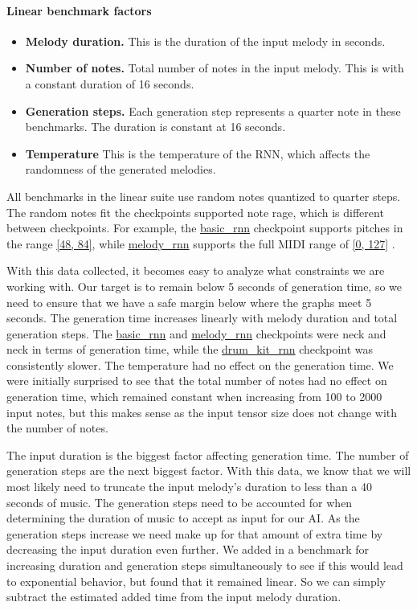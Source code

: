 \paragraph{Linear benchmark factors}
\begin{itemize}
  \item \textbf{Melody duration.} This is the duration of the input melody in seconds.
  \item \textbf{Number of notes.} Total number of notes in the input melody. This is with
        a constant duration of 16 seconds.
  \item \textbf{Generation steps.} Each generation step represents a quarter note in these
        benchmarks. The duration is constant at 16 seconds.
  \item \textbf{Temperature} This is the temperature of the RNN, which affects the
        randomness of the generated melodies.
\end{itemize}

All benchmarks in the linear suite use random notes quantized to quarter steps. The random
notes fit the checkpoints supported note rage, which is different between checkpoints. For
example, the \url{basic_rnn} checkpoint supports pitches in the range \url{[48, 84]},
while \url{melody_rnn} supports the full MIDI range of \url{[0, 127]}
\autocite{modelPitchRange}.

With this data collected, it becomes easy to analyze what constraints we are working
with. Our target is to remain below 5 seconds of generation time, so we need to ensure
that we have a safe margin below where the graphs meet 5 seconds. The generation time
increases linearly with melody duration and total generation steps. The \url{basic_rnn}
and \url{melody_rnn} checkpoints were neck and neck in terms of generation time, while the
\url{drum_kit_rnn} checkpoint was consistently slower. The temperature had no effect on
the generation time. We were initially surprised to see that the total number of notes had
no effect on generation time, which remained constant when increasing from 100 to 2000
input notes, but this makes sense as the input tensor size does not change with the number
of notes.

The input duration is the biggest factor affecting generation time. The number of
generation steps are the next biggest factor. With this data, we know that we will most
likely need to truncate the input melody's duration to less than a 40 seconds of music.
The generation steps need to be accounted for when determining the duration of music to
accept as input for our AI. As the generation steps increase we need make up for that
amount of extra time by decreasing the input duration even further. We added in a
benchmark for increasing duration and generation steps simultaneously to see if this would
lead to exponential behavior, but found that it remained linear. So we can simply subtract
the estimated added time from the input melody duration.

